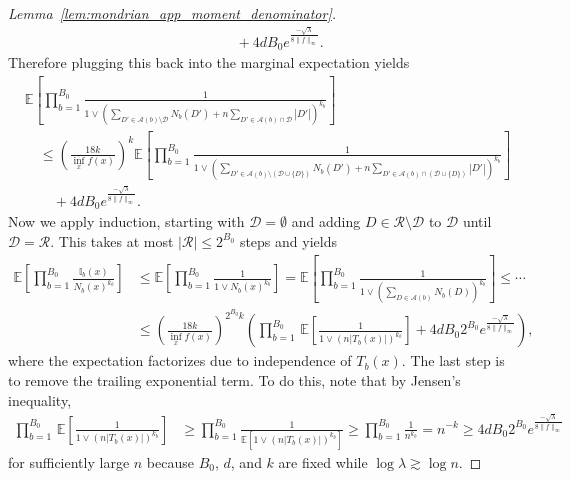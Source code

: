 \documentclass[11pt,lof]{puthesis}
\newcommand{\E}{\ensuremath{\mathbb{E}}}
\newcommand{\I}{\ensuremath{\mathbb{I}}}
\newcommand{\cR}{\ensuremath{\mathcal{R}}}
\newcommand{\cA}{\ensuremath{\mathcal{A}}}
\newcommand{\cD}{\ensuremath{\mathcal{D}}}
\theoremstyle{break}
\theoremstyle{proof}
\newtheorem{proof}{Proof}
\begin{document}
\begin{proof}[Lemma~\ref{lem:mondrian_app_moment_denominator}]
\begin{align*}
    &\qquad+
    4 d B_0 e^{\frac{-\sqrt \lambda}{8 \|f\|_\infty}}.
  \end{align*}
  Therefore plugging this back into the marginal expectation yields
  \begin{align*}
    &\E\left[
      \prod_{b=1}^{B_0}
      \frac{1}{
        1 \vee \left(
          \sum_{D' \in \cA(b) \setminus \cD}
          N_b(D')
          + n \sum_{D' \in \cA(b) \cap \cD}
          |D'|
        \right)^{k_b}
      }
    \right] \\
    &\quad\leq
    \left( \frac{18k}{\inf_x f(x)} \right)^k
    \E \left[
      \prod_{b=1}^{B_0}
      \frac{1}{
        1 \vee \left(
          \sum_{D' \in \cA(b) \setminus (\cD \cup \{D\})}
          N_b(D')
          + n \sum_{D' \in \cA(b) \cap (\cD \cup \{D\})}
          |D'|
      \right)^{k_b}}
    \right] \\
    &\qquad+
    4 d B_0 e^{\frac{-\sqrt \lambda}{8 \|f\|_\infty}}.
  \end{align*}
  Now we apply induction,
  starting with $\cD = \emptyset$ and
  adding $D \in \cR \setminus \cD$ to $\cD$ until
  $\cD = \cR$.
  This takes at most $|\cR| \leq 2^{B_0}$ steps and yields
  \begin{align*}
    \E\left[
      \prod_{b=1}^{B_0}
      \frac{\I_b(x)}{N_b(x)^{k_b}}
    \right]
    &\leq
    \E\left[
      \prod_{b=1}^{B_0}
      \frac{1}{1 \vee N_b(x)^{k_b}}
    \right]
    =
    \E\left[
      \prod_{b=1}^{B_0}
      \frac{1}{1 \vee \left( \sum_{D \in \cA(b)} N_b(D) \right)^{k_b}}
    \right]
    \leq \cdots \\
    &\leq
    \left( \frac{18k}{\inf_x f(x)} \right)^{2^{B_0} k}
    \left(
      \prod_{b=1}^{B_0}
      \,\E \left[
        \frac{1}{1 \vee (n |T_b(x)|)^{k_b}}
      \right]
      + 4 d B_0 2^{B_0} e^{\frac{-\sqrt \lambda}{8 \|f\|_\infty}}
    \right),
  \end{align*}
  where the expectation factorizes due to independence of $T_b(x)$.
  The last step is to remove the trailing exponential term.
  To do this, note that by Jensen's inequality,
  \begin{align*}
    \prod_{b=1}^{B_0}
    \,\E \left[
      \frac{1}{1 \vee (n |T_b(x)|)^{k_b}}
    \right]
    &\geq
    \prod_{b=1}^{B_0}
    \frac{1}
    {\E \left[ 1 \vee (n |T_b(x)|)^{k_b} \right]}
    \geq
    \prod_{b=1}^{B_0}
    \frac{1}{n^{k_b}}
    = n^{-k}
    \geq
    4 d B_0 2^{B_0} e^{\frac{-\sqrt \lambda}{8 \|f\|_\infty}}
  \end{align*}
  for sufficiently large $n$
  because $B_0$, $d$, and $k$ are fixed while
  $\log \lambda \gtrsim \log n$.
\end{proof}
\end{document}
